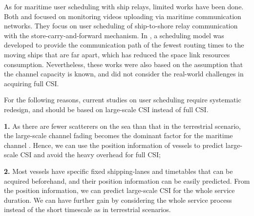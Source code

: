 \documentclass[conference]{IEEEtran}
\begin{document}
 As for maritime user scheduling with ship relays, limited works have been done. %
 Both \cite{p300} and \cite{p301} focused on monitoring videos uploading via maritime communication networks. They focus on user scheduling of ship-to-shore relay communication with the store-carry-and-forward mechanism.  
 In \cite{p303}, a scheduling model was developed to provide the communication path of the fewest routing times to the moving ships that are far apart, which has reduced the space link resources consumption. 
 Nevertheless, these works were also based on the assumption that the channel capacity is known, and did not consider the real-world challenges in acquiring full CSI. 
 
 
 
 For the following reasons, current studies on user scheduling require systematic redesign, and should be based on large-scale CSI instead of full CSI. 
 
 \textbf{1.} As there are fewer scatterers on the sea than that in the terrestrial scenario, the large-scale channel fading becomes the dominant factor for the maritime channel \cite{p403}. Hence, we can use the position information of vessels to predict large-scale CSI and avoid the heavy overhead for full CSI; 
 
 \textbf{2.} %
 Most vessels have specific fixed shipping-lanes and timetables that can be acquired beforehand, and their position information can be easily predicted. From the position information, we can predict large-scale CSI for the whole service duration. We can have further gain by considering the whole service process instead of the short timescale as in terrestrial scenarios. 
 
\end{document}

